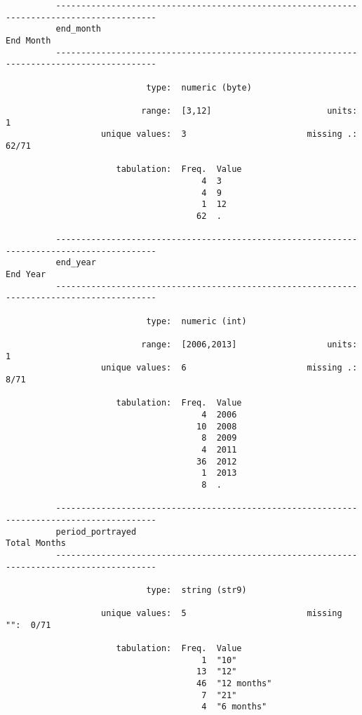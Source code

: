 \documentclass{article}
\begin{document}
\begin{verbatim}
          ------------------------------------------------------------------------------------------
          end_month                                                                        End Month
          ------------------------------------------------------------------------------------------
          
                            type:  numeric (byte)
          
                           range:  [3,12]                       units:  1
                   unique values:  3                        missing .:  62/71
          
                      tabulation:  Freq.  Value
                                       4  3
                                       4  9
                                       1  12
                                      62  .
          
          ------------------------------------------------------------------------------------------
          end_year                                                                          End Year
          ------------------------------------------------------------------------------------------
          
                            type:  numeric (int)
          
                           range:  [2006,2013]                  units:  1
                   unique values:  6                        missing .:  8/71
          
                      tabulation:  Freq.  Value
                                       4  2006
                                      10  2008
                                       8  2009
                                       4  2011
                                      36  2012
                                       1  2013
                                       8  .
          
          ------------------------------------------------------------------------------------------
          period_portrayed                                                              Total Months
          ------------------------------------------------------------------------------------------
          
                            type:  string (str9)
          
                   unique values:  5                        missing "":  0/71
          
                      tabulation:  Freq.  Value
                                       1  "10"
                                      13  "12"
                                      46  "12 months"
                                       7  "21"
                                       4  "6 months"
          

\end{verbatim}
\end{document}
